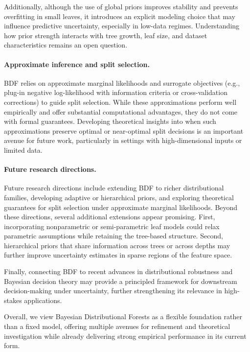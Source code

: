 \documentclass[twoside,11pt]{article}
\begin{document}
Additionally, although the use of global priors improves stability and prevents overfitting in small leaves, it introduces an explicit modeling choice that may influence predictive uncertainty, especially in low-data regimes. Understanding how prior strength interacts with tree growth, leaf size, and dataset characteristics remains an open question.

\paragraph{Approximate inference and split selection.}
BDF relies on approximate marginal likelihoods and surrogate objectives (e.g., plug-in negative log-likelihood with information criteria or cross-validation corrections) to guide split selection. While these approximations perform well empirically and offer substantial computational advantages, they do not come with formal guarantees. Developing theoretical insights into when such approximations preserve optimal or near-optimal split decisions is an important avenue for future work, particularly in settings with high-dimensional inputs or limited data.

\paragraph{Future research directions.}
Future research directions include extending BDF to richer distributional families, developing adaptive or hierarchical priors, and exploring theoretical guarantees for split selection under approximate marginal likelihoods. Beyond these directions, several additional extensions appear promising. First, incorporating nonparametric or semi-parametric leaf models could relax parametric assumptions while retaining the tree-based structure. Second, hierarchical priors that share information across trees or across depths may further improve uncertainty estimates in sparse regions of the feature space.

Finally, connecting BDF to recent advances in distributional robustness and Bayesian decision theory may provide a principled framework for downstream decision-making under uncertainty, further strengthening its relevance in high-stakes applications.

Overall, we view Bayesian Distributional Forests as a flexible foundation rather than a fixed model, offering multiple avenues for refinement and theoretical investigation while already delivering strong empirical performance in its current form.
\end{document}
